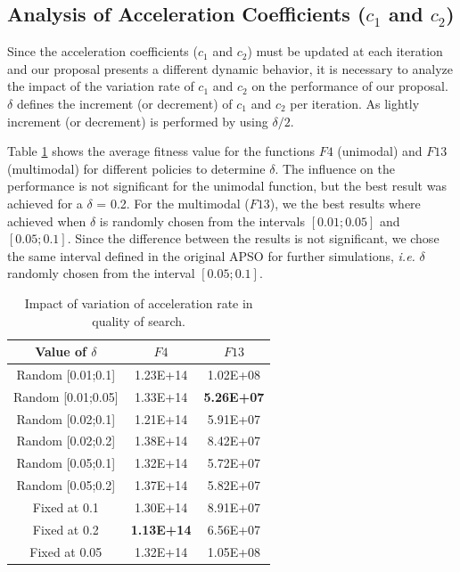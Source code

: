 \subsection{Analysis of Acceleration Coefficients ($c_1$ and $c_2$)}
Since the acceleration coefficients ($c_1$ and $c_2$) must be updated at each iteration and our proposal presents a different dynamic behavior, it is necessary to analyze the impact of the variation rate of $c_1$ and $c_2$ on the performance of our proposal. $\delta$ defines the increment (or decrement) of $c_1$ and $c_2$ per iteration. As lightly increment (or decrement) is performed by using $\delta/2$.

Table \ref{tab:acceleration_coefficients} shows the average fitness value for the functions $F4$ (unimodal) and $F13$ (multimodal) for different policies to determine $\delta$. The influence on the performance is not significant for the unimodal function, but the best result was achieved for a $\delta$ = 0.2. For the multimodal ($F13$), we the best results where achieved when $\delta$ is randomly chosen from the intervals $[0.01;0.05]$ and $[0.05;0.1]$. Since the difference between the results is not significant, we chose the same interval defined in the original APSO for further simulations, \textit{i.e.} $\delta$ randomly chosen from the interval $[0.05;0.1]$.

\begin{table}[!h]
\caption{\small{Impact of variation of acceleration rate in quality of search.}}
\centering
\begin{tabular}{c c c}
\hline
Value of $\delta$  &   $F4$               &  $F13$ \\
\hline
Random [0.01;0.1]    & 1.23E+14          & 1.02E+08 \\
Random [0.01;0.05]   & 1.33E+14          & \textbf{5.26E+07} \\
Random [0.02;0.1]    & 1.21E+14          & 5.91E+07 \\
Random [0.02;0.2]    & 1.38E+14          & 8.42E+07  \\
Random [0.05;0.1]    & 1.32E+14          & 5.72E+07  \\
Random [0.05;0.2]    & 1.37E+14          & 5.82E+07  \\
Fixed at 0.1          & 1.30E+14          & 8.91E+07  \\
Fixed at 0.2          & \textbf{1.13E+14} & 6.56E+07  \\
Fixed at 0.05         & 1.32E+14          & 1.05E+08  \\
\hline
\end{tabular}
\label{tab:acceleration_coefficients}
\end{table}

